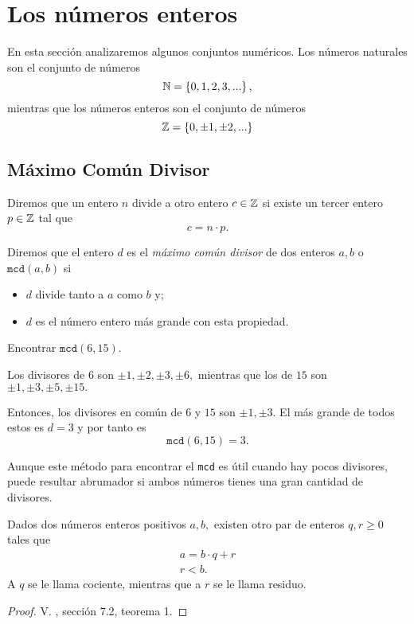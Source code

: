 \section{Los números enteros}
	
	En esta sección analizaremos algunos conjuntos numéricos. 
	Los números naturales son el conjunto de números
	$$
	\mathbb{N}=\left\{ 0,1,2,3,... \right\},
	$$	
	mientras que los números enteros son el conjunto de números
	$$
	\mathbb{Z}=\left\{ 0, \pm1, \pm2,... \right\}	$$	


\subsection{Máximo Común Divisor}
	
\begin{defn}
	Diremos que un entero $n$ divide a otro entero $c\in \mathbb{Z}$ si existe un tercer entero $p\in \mathbb{Z}$ tal que 
	$$c=n\cdot p.$$
\end{defn}

\begin{defn}
	\label{mcd} 
	Diremos que el entero $d$ es el \emph{máximo común divisor} de dos enteros $a,b$ o $\texttt{mcd}(a,b)$  si
	\begin{itemize}
		\item $d$ divide tanto a $a$ como $b$ y;
		\item $d$ es el número entero más grande con esta propiedad.
	\end{itemize}
\end{defn}

	\begin{problema}
		\label{exmp:mcd}
		Encontrar $\texttt{mcd}(6,15).$
	\end{problema}
		
	\begin{solucion}
		Los divisores de $6$ son $\pm1, \pm2, \pm3, \pm6,$ mientras que los de $15$ son $\pm1, \pm3, \pm5, \pm15.$
		 		
		Entonces, los divisores en común de $6$ y $15$ son $\pm1,\pm3.$ El más grande de todos estos es 
		$d=3$ y por tanto es $$ \texttt{mcd}(6,15)=3. $$
	\end{solucion}
	
 	Aunque este m\'etodo para encontrar el \texttt{mcd} es útil cuando hay pocos divisores, puede resultar abrumador si  	ambos números tienes una gran cantidad de divisores. 
   
	\begin{prop}
		Dados dos números enteros positivos $a,b,$ existen otro par de enteros $q, r\geq 0$ tales que
		\begin{align}
			\label{cociente}
			a=b\cdot q+r\\
			\label{residuo}
			r<b.
		\end{align}
		A $q$ se le llama cociente, mientras que a $r$ se le llama residuo.
	\end{prop}
	\begin{proof}
		V. \cite{cardenas1973algebra}, sección 7.2, teorema 1.
	\end{proof}


